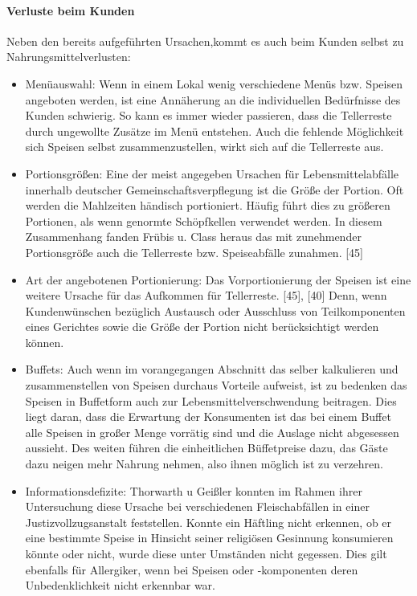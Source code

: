 \paragraph{Verluste beim Kunden}
Neben den bereits aufgeführten Ursachen,kommt es auch beim Kunden selbst zu Nahrungsmittelverlusten:


\begin{itemize}
  \item Menüauswahl: Wenn in einem Lokal wenig verschiedene Menüs bzw. Speisen angeboten werden, ist eine Annäherung an die individuellen Bedürfnisse des Kunden schwierig. So kann es immer wieder passieren, dass die Tellerreste durch ungewollte Zusätze im Menü entstehen. Auch die fehlende Möglichkeit sich Speisen selbst zusammenzustellen, wirkt sich auf die Tellerreste aus. %

  \item Portionsgrößen: Eine der meist angegeben Ursachen für Lebensmittelabfälle innerhalb deutscher Gemeinschaftsverpflegung ist die Größe der Portion. Oft werden die Mahlzeiten händisch portioniert. Häufig führt dies zu größeren Portionen, als wenn genormte Schöpfkellen verwendet werden. In diesem Zusammenhang fanden Frübis u. Class heraus das mit zunehmender Portionsgröße auch die Tellerreste bzw. Speiseabfälle zunahmen. [45] %
  \item Art der angebotenen Portionierung: Das Vorportionierung der Speisen ist eine weitere Ursache für das Aufkommen für Tellerreste. [45], [40] Denn, wenn Kundenwünschen bezüglich Austausch oder Ausschluss von Teilkomponenten eines Gerichtes sowie die Größe der Portion nicht berücksichtigt werden können. %
  \item Buffets: Auch wenn im vorangegangen Abschnitt das selber kalkulieren und zusammenstellen von Speisen durchaus Vorteile aufweist, ist zu bedenken das Speisen in Buffetform auch zur Lebensmittelverschwendung beitragen. Dies liegt daran, dass die Erwartung der Konsumenten ist das bei einem Buffet alle Speisen in großer Menge vorrätig sind und die Auslage nicht abgesessen aussieht. Des weiten führen die einheitlichen Büffetpreise dazu, das Gäste dazu neigen mehr Nahrung nehmen, also ihnen möglich ist zu verzehren.  %
  \item  Informationsdefizite: Thorwarth u Geißler konnten im Rahmen ihrer Untersuchung diese Ursache bei verschiedenen Fleischabfällen in einer Justizvollzugsanstalt feststellen. Konnte ein Häftling nicht erkennen, ob er eine bestimmte Speise in Hinsicht seiner religiösen Gesinnung konsumieren könnte oder nicht, wurde diese unter Umständen nicht gegessen. Dies gilt ebenfalls für Allergiker, wenn bei Speisen oder -komponenten deren Unbedenklichkeit nicht erkennbar war. %
  

\end{itemize}
